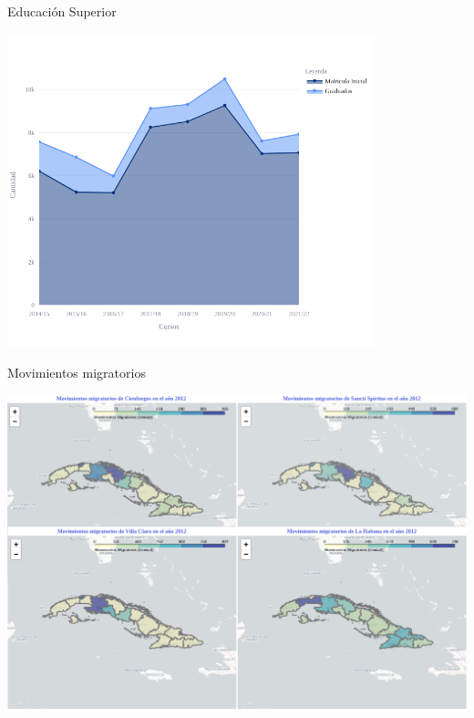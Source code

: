 \documentclass{beamer}
\begin{document}
\begin{frame}
    \begin{block}{Educación Superior}
    \begin{center}
        \includegraphics[width=0.8\textwidth]{img/fig2.png}
    \end{center}
    \end{block}
\end{frame}

\begin{frame}
    \begin{block}{Movimientos migratorios}
        \begin{center}
            \includegraphics[width=1.0\textwidth]{img/fig3.png}
        \end{center}
    \end{block}
\end{frame}
\end{document}
